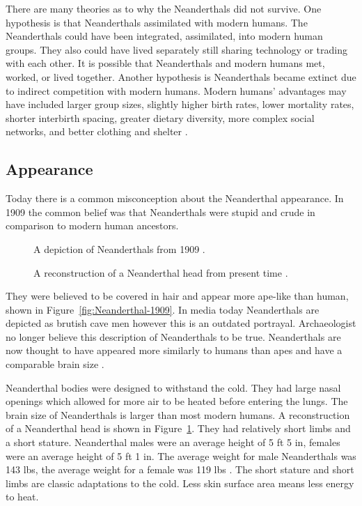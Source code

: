 There are many theories as to why the Neanderthals did not survive. One hypothesis is that Neanderthals assimilated with modern humans. The Neanderthals could have been integrated, assimilated, into modern human groups. They also could have lived separately still sharing technology or trading with each other. It is possible that Neanderthals and modern humans met, worked, or lived together. Another hypothesis is Neanderthals became extinct due to indirect competition with modern humans. Modern humans' advantages may have included larger group sizes, slightly higher birth rates, lower mortality rates, shorter interbirth spacing, greater dietary diversity, more complex social networks, and better clothing and shelter \cite{Harvati2010}. 


\subsection{Appearance}
Today there is a common misconception about the Neanderthal appearance. In 1909 the common belief was that Neanderthals were stupid and crude in comparison to modern human ancestors. 
\begin{figure}
	\centering
	\begin{minipage}{.5\textwidth}
		\centering
		\caption{A depiction of Neanderthals from 1909 \cite{larsen_2017}.} \label{fig:Neanderthal-1909}
	\end{minipage}%
	\begin{minipage}{.5\textwidth}
		\centering
		\caption{A reconstruction of a Neanderthal head from present time \cite{Smithsonian}.} \label{fig:Neanderthal-recon}
	\end{minipage}
\end{figure}They were believed to be covered in hair and appear more ape-like than human, shown in Figure~\ref{fig:Neanderthal-1909}. In media today Neanderthals are depicted as brutish cave men however this is an outdated portrayal. Archaeologist no longer believe this description of Neanderthals to be true. Neanderthals are now thought to have appeared more similarly to humans than apes and have a comparable brain size \cite{larsen_2017}.


Neanderthal bodies were designed to withstand the cold. They had large nasal openings which allowed for more air to be heated before entering the lungs. The brain size of Neanderthals is larger than most modern humans. A reconstruction of a Neanderthal head is shown in Figure~\ref{fig:Neanderthal-recon}. They had relatively short limbs and a short stature. 
Neanderthal males were an average height of 5 ft 5 in, females were an average height of 5 ft 1 in. The average weight for male Neanderthals was 143 lbs, the average weight for a female was 119 lbs \cite{Smithsonian}. The short stature and short limbs are classic adaptations to the cold. Less skin surface area means less energy to heat. 


